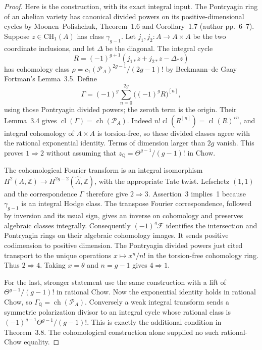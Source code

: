 \begin{proof}
Here is the construction, with its exact integral input.
The Pontryagin ring of an abelian variety has canonical divided
powers on its positive-dimensional cycles by Moonen--Polishchuk,
Theorem~1.6 and Corollary~1.7 (author pp.~6--7).
Suppose $z\in\mathrm{CH}_1(A)$ has class $\gamma_{g-1}$.
Let $j_1,j_2:A\to A\times A$ be the two coordinate inclusions,
and let $\Delta$ be the diagonal.  The integral cycle
\[
 R=(-1)^{g+1}(j_{1*}z+j_{2*}z-\Delta_*z)
\]
has cohomology class
$\rho=c_1(\mathcal P_A)^{2g-1}/(2g-1)!$ by
Beckmann--de Gaay Fortman's Lemma~3.5.  Define
\[
 \Gamma=(-1)^g\sum_{n=0}^{2g}\bigl((-1)^gR\bigr)^{[n]},
\]
using those Pontryagin divided powers; the zeroth term is the
origin.  Their Lemma~3.4 gives
$\operatorname{cl}(\Gamma)=\operatorname{ch}(\mathcal P_A)$.
Indeed $n!\operatorname{cl}(R^{[n]})=
\operatorname{cl}(R)^{\star n}$, and integral cohomology of
$A\times A$ is torsion-free, so these divided classes agree
with the rational exponential identity.  Terms of dimension
larger than $2g$ vanish.  This proves $1\Rightarrow2$ without
assuming that $z_{\mathbb Q}=\Theta^{g-1}/(g-1)!$ in Chow.

The cohomological Fourier transform is an integral isomorphism
$H^2(A,\mathbb Z)\to H^{2g-2}(\widehat A,\mathbb Z)$,
with the appropriate Tate twist.  Lefschetz $(1,1)$ and the
correspondence $\Gamma$ therefore give $2\Rightarrow3$.
Assertion~3 implies~1 because $\gamma_{g-1}$ is an integral
Hodge class.  The transpose Fourier correspondence, followed
by inversion and its usual sign, gives an inverse on
cohomology and preserves algebraic classes integrally.
Consequently $(-1)^g\mathcal F$ identifies the intersection
and Pontryagin rings on their algebraic cohomology images.
It sends positive codimension to positive dimension.  The
Pontryagin divided powers just cited transport to the unique
operations $x\mapsto x^n/n!$ in the torsion-free cohomology
ring.  Thus $2\Rightarrow4$.  Taking $x=\theta$ and
$n=g-1$ gives $4\Rightarrow1$.

For the last, stronger statement use the same construction
with a lift of $\Theta^{g-1}/(g-1)!$ in rational Chow.
Now the exponential identity holds in rational Chow, so
$\Gamma_{\mathbb Q}=\operatorname{ch}(\mathcal P_A)$.
Conversely a weak integral transform sends a symmetric
polarization divisor to an integral cycle whose rational
class is $(-1)^{g-1}\Theta^{g-1}/(g-1)!$.
This is exactly the additional condition in Theorem~3.8.
The cohomological construction alone supplied no such
rational-Chow equality.
\end{proof}

